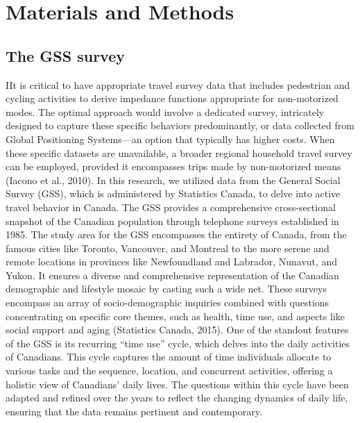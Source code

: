 \documentclass[
11pt, %
oneside, %
english, %
singlespacing, %
]{macthesis} %
\begin{document}
\hypertarget{materials-and-methods}{%
\section{Materials and Methods}\label{materials-and-methods}}

\hypertarget{the-gss-survey}{%
\subsection{The GSS survey}\label{the-gss-survey}}

IIt is critical to have appropriate travel survey data that includes pedestrian and cycling activities to derive impedance functions appropriate for non-motorized modes. The optimal approach would involve a dedicated survey, intricately designed to capture these specific behaviors predominantly, or data collected from Global Positioning Systems---an option that typically has higher costs. When these specific datasets are unavailable, a broader regional household travel survey can be employed, provided it encompasses trips made by non-motorized means (Iacono et al., 2010). In this research, we utilized data from the General Social Survey (GSS), which is administered by Statistics Canada, to delve into active travel behavior in Canada. The GSS provides a comprehensive cross-sectional snapshot of the Canadian population through telephone surveys established in 1985. The study area for the GSS encompasses the entirety of Canada, from the famous cities like Toronto, Vancouver, and Montreal to the more serene and remote locations in provinces like Newfoundland and Labrador, Nunavut, and Yukon. It ensures a diverse and comprehensive representation of the Canadian demographic and lifestyle mosaic by casting such a wide net. These surveys encompass an array of socio-demographic inquiries combined with questions concentrating on specific core themes, such as health, time use, and aspects like social support and aging (Statistics Canada, 2015). One of the standout features of the GSS is its recurring ``time use'' cycle, which delves into the daily activities of Canadians. This cycle captures the amount of time individuals allocate to various tasks and the sequence, location, and concurrent activities, offering a holistic view of Canadians' daily lives. The questions within this cycle have been adapted and refined over the years to reflect the changing dynamics of daily life, ensuring that the data remains pertinent and contemporary.
\end{document}
